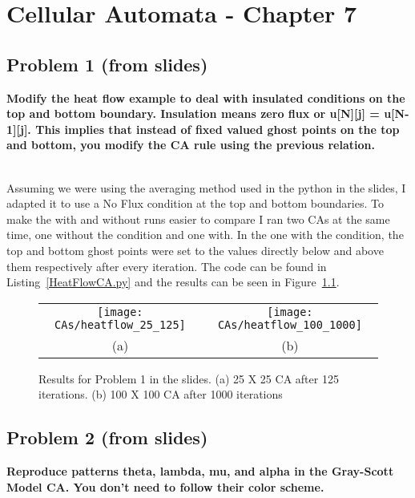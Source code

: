 
\chapter{Cellular Automata - Chapter 7}

\section{Problem 1 (from slides)}
\textbf{
Modify the heat flow example to deal with insulated conditions on the top and bottom boundary. Insulation means zero flux or u[N][j] = u[N-1][j]. This implies that instead of fixed valued ghost points on the top and bottom, you modify the CA rule using the previous relation.
}

\hfill \\

Assuming we were using the averaging method used in the python in the slides, I adapted it to use a No Flux condition at the top and bottom boundaries. To make the with and without runs easier to compare I ran two CAs at the same time, one without the condition and one with. In the one with the condition, the top and bottom ghost points were set to the values directly below and above them respectively after every iteration. The code can be found in Listing~\ref{HeatFlowCA.py} and the results can be seen in Figure~\ref{heatflow_results}.

\begin{figure}
\centering
\begin{tabular}{c c} 
\texttt{[image: CAs/heatflow\_25\_125]} & \texttt{[image: CAs/heatflow\_100\_1000]} \\
(a) & (b) \\
\end{tabular}
\caption{Results for Problem 1 in the slides. (a) 25 X 25 CA after 125 iterations. (b) 100 X 100 CA after 1000 iterations}
\label{heatflow_results}
\end{figure}

\section{Problem 2 (from slides)}
\textbf{
Reproduce patterns theta, lambda, mu, and alpha in the Gray-Scott Model CA. You don't need to follow their color scheme.
}

\hfill \\

